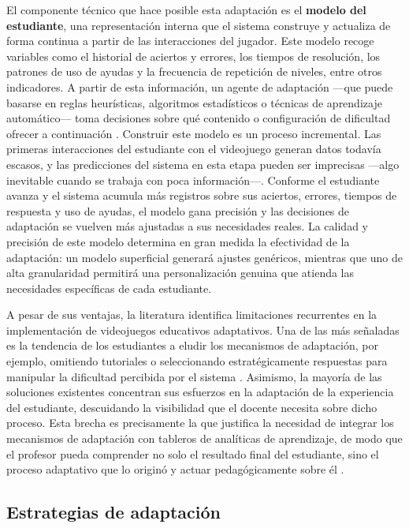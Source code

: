 El componente técnico que hace posible esta adaptación es el \textbf{modelo del
	estudiante}, una representación interna que el sistema construye y actualiza
de forma continua a partir de las interacciones del jugador. Este modelo recoge
variables como el historial de aciertos y errores, los tiempos de resolución,
los patrones de uso de ayudas y la frecuencia de repetición de niveles, entre
otros indicadores. A partir de esta información, un agente de adaptación —que
puede basarse en reglas heurísticas, algoritmos estadísticos o técnicas de
aprendizaje automático— toma decisiones sobre qué contenido o configuración
de dificultad ofrecer a continuación \cite{shum_personalised_2023}. Construir
este modelo es un proceso incremental. Las primeras interacciones del estudiante
con el videojuego generan datos todavía escasos, y las predicciones del sistema
en esta etapa pueden ser imprecisas —algo inevitable cuando se trabaja con poca
información—. Conforme el estudiante avanza y el sistema acumula más registros
sobre sus aciertos, errores, tiempos de respuesta y uso de ayudas, el modelo
gana precisión y las decisiones de adaptación se vuelven más ajustadas a sus
necesidades reales. La calidad y precisión de este modelo determina en gran
medida la efectividad de la adaptación: un modelo superficial generará ajustes
genéricos, mientras que uno de alta granularidad permitirá una personalización
genuina que atienda las necesidades específicas de cada estudiante.

A pesar de sus ventajas, la literatura identifica limitaciones recurrentes en la
implementación de videojuegos educativos adaptativos. Una de las más señaladas
es la tendencia de los estudiantes a eludir los mecanismos de adaptación, por
ejemplo, omitiendo tutoriales o seleccionando estratégicamente respuestas para
manipular la dificultad percibida por el sistema \cite{lindberg2017improving}.
Asimismo, la mayoría de las soluciones existentes concentran sus esfuerzos en
la adaptación de la experiencia del estudiante, descuidando la visibilidad que
el docente necesita sobre dicho proceso. Esta brecha es precisamente la que
justifica la necesidad de integrar los mecanismos de adaptación con tableros de
analíticas de aprendizaje, de modo que el profesor pueda comprender no solo el
resultado final del estudiante, sino el proceso adaptativo que lo originó y
actuar pedagógicamente sobre él \cite{rahimi2021learning, shum_personalised_2023}.

\subsection{Estrategias de adaptación}

